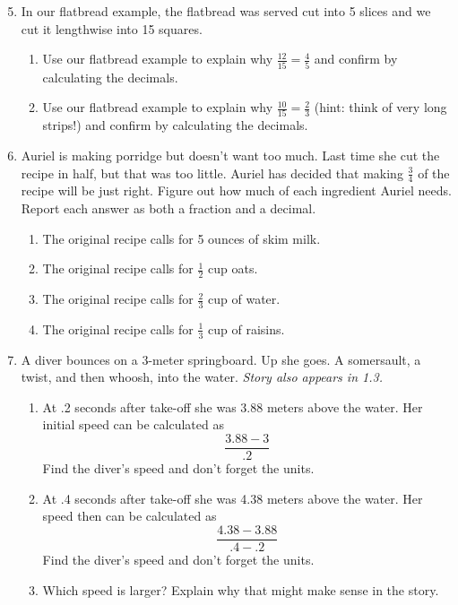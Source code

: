 \begin{enumerate} 
\setcounter{enumi}{4}

\item In our flatbread example, the flatbread was served cut into 5 slices and we cut it lengthwise into 15 squares. 
\begin{enumerate}
\item Use our flatbread example to explain why $\frac{12}{15} = \frac{4}{5}$ and confirm by calculating the decimals. 
\item Use our flatbread example to explain why $\frac{10}{15} = \frac{2}{3}$ (hint:  think of very long strips!) and confirm by calculating the decimals.
\end{enumerate}

\item Auriel is making porridge but doesn't want too much.  Last time she cut the recipe in half, but that was too little. Auriel has decided that making $\frac{3}{4}$ of the recipe will be just right.  Figure out how much of each ingredient Auriel needs.  Report each answer as both a fraction and a decimal.

\begin{enumerate}
\item The original recipe calls for 5 ounces of skim milk.
\item The original recipe calls for $\frac{1}{2}$ cup oats.
\item The original recipe calls for $\frac{2}{3}$ cup of water.
\item The original recipe calls for $\frac{1}{3}$ cup of raisins.  
\end{enumerate}

\item A diver bounces on a 3-meter springboard.  Up she goes.  A somersault, a twist, and then whoosh, into the water.  \hfill \emph{Story also appears in 1.3.}
\begin{enumerate}
\item At .2 seconds after take-off she was 3.88 meters above the water.  Her initial speed can be calculated as 
$$\frac{3.88-3}{.2}$$
Find the diver's speed and don't forget the units.
\item At .4 seconds after take-off she was 4.38 meters above the water.  Her speed then can be calculated as 
$$\frac{4.38-3.88}{.4-.2 }$$
Find the diver's speed and don't forget the units.
\item Which speed is larger? Explain why that might make sense in the story.
\end{enumerate}


\end{enumerate}

